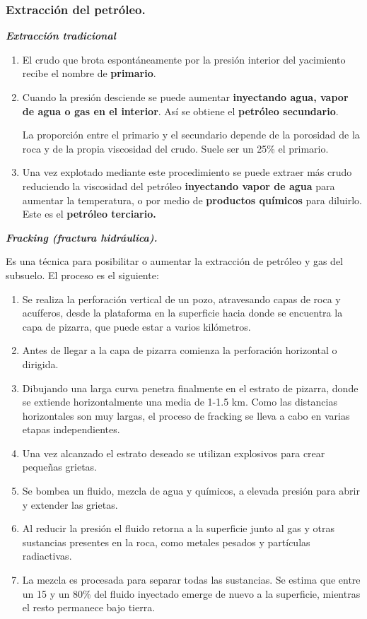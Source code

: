 		\subsubsection{Extracción del petróleo.}
			\textbf{\textit{Extracción tradicional}}
				\begin{enumerate}
					\item 
						El crudo que brota espontáneamente por la presión interior del yacimiento recibe el nombre de \textbf{primario}.
					\item 
						Cuando la presión desciende se puede aumentar \textbf{inyectando agua, vapor de agua o gas en el interior}. Así se obtiene el \textbf{petróleo secundario}.
					
						La proporción entre el primario y el secundario depende de la porosidad de la roca y de la propia viscosidad del crudo. Suele ser un 25\% el primario.
					\item 
						Una vez explotado mediante este procedimiento se puede extraer más crudo reduciendo la viscosidad del petróleo \textbf{inyectando vapor de agua} para aumentar la temperatura, o por medio de \textbf{productos químicos} para diluirlo. Este es el \textbf{petróleo terciario.}
				\end{enumerate}
				
			\textbf{\textit{Fracking (fractura hidráulica).}}
			
			
				Es una técnica para posibilitar o aumentar la extracción de petróleo y gas del subsuelo. El proceso es el siguiente:
				\begin{enumerate}
					\item
						Se realiza la perforación vertical de un pozo, atravesando capas de roca y acuíferos, desde la plataforma en la superficie hacia donde se encuentra la capa de pizarra, que puede estar a varios kilómetros.
					\item 
						Antes de llegar a la capa de pizarra comienza la perforación horizontal o dirigida.
					\item 
						Dibujando una larga curva penetra finalmente en el estrato de pizarra, donde se extiende horizontalmente una media de 1-1.5 km. Como las distancias horizontales son muy largas, el proceso de fracking se lleva a cabo en varias etapas independientes.
					\item
						Una vez alcanzado el estrato deseado se utilizan explosivos para crear pequeñas grietas.
					\item 
						Se bombea un fluido, mezcla de agua y químicos, a elevada presión para abrir y extender las grietas.
					\item 	
						Al reducir la presión el fluido retorna a la superficie junto al gas y otras sustancias presentes en la roca, como metales pesados y partículas radiactivas.
					\item 
						La mezcla es procesada para separar todas las sustancias. Se estima que entre un 15 y un 80\% del fluido inyectado emerge de nuevo a la superficie, mientras el resto permanece bajo tierra.
				\end{enumerate}
				
